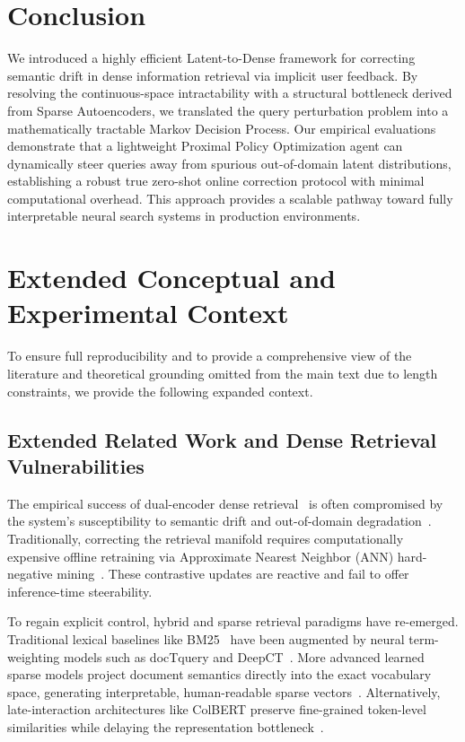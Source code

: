 \section{Conclusion}
We introduced a highly efficient Latent-to-Dense framework for correcting semantic drift in dense information retrieval via implicit user feedback. By resolving the continuous-space intractability with a structural bottleneck derived from Sparse Autoencoders, we translated the query perturbation problem into a mathematically tractable Markov Decision Process. Our empirical evaluations demonstrate that a lightweight Proximal Policy Optimization agent can dynamically steer queries away from spurious out-of-domain latent distributions, establishing a robust true zero-shot online correction protocol with minimal computational overhead. This approach provides a scalable pathway toward fully interpretable neural search systems in production environments.

\clearpage




\appendix

\section{Extended Conceptual and Experimental Context}

To ensure full reproducibility and to provide a comprehensive view of the literature and theoretical grounding omitted from the main text due to length constraints, we provide the following expanded context.

\subsection{Extended Related Work and Dense Retrieval Vulnerabilities}
The empirical success of dual-encoder dense retrieval~\citep{karpukhin2020, izacard2022} is often compromised by the system's susceptibility to semantic drift and out-of-domain degradation~\citep{zhan2021}. Traditionally, correcting the retrieval manifold requires computationally expensive offline retraining via Approximate Nearest Neighbor (ANN) hard-negative mining~\citep{qu2021, hofstatter2021, xiong2021}. These contrastive updates are reactive and fail to offer inference-time steerability.

To regain explicit control, hybrid and sparse retrieval paradigms have re-emerged. Traditional lexical baselines like BM25~\citep{robertson1994} have been augmented by neural term-weighting models such as docTquery and DeepCT~\citep{nogueira2019, dai2019}. More advanced learned sparse models project document semantics directly into the exact vocabulary space, generating interpretable, human-readable sparse vectors~\citep{formal2021splade, formal2021spladev2, gao2021coil}. Alternatively, late-interaction architectures like ColBERT preserve fine-grained token-level similarities while delaying the representation bottleneck~\citep{khattab2020, santhanam2022, lin2021, luan2021}. 

